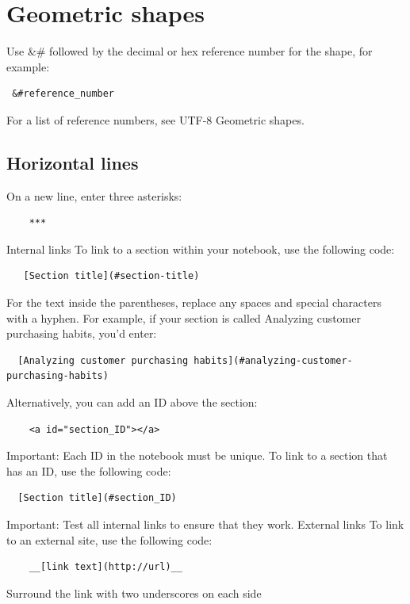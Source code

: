 \section{Geometric shapes}
Use \&\# followed by the decimal or hex reference number for the shape, for example:
\begin{verbatim}
 &#reference_number   
\end{verbatim}

For a list of reference numbers, see UTF-8 Geometric shapes.

\subsection{Horizontal lines}
On a new line, enter three asterisks:
\begin{verbatim}
    ***
\end{verbatim}

Internal links
To link to a section within your notebook, use the following code:
\begin{verbatim}
   [Section title](#section-title) 
\end{verbatim}

For the text inside the parentheses, replace any spaces and special characters with a hyphen. For example, if your section is called Analyzing customer purchasing habits, you'd enter:
\begin{verbatim}
  [Analyzing customer purchasing habits](#analyzing-customer-purchasing-habits)  
\end{verbatim}


Alternatively, you can add an ID above the section:
\begin{verbatim}
    <a id="section_ID"></a>
\end{verbatim}

Important: Each ID in the notebook must be unique.
To link to a section that has an ID, use the following code:
\begin{verbatim}
  [Section title](#section_ID)  
\end{verbatim}


Important: Test all internal links to ensure that they work.
External links
To link to an external site, use the following code:
\begin{verbatim}
    __[link text](http://url)__
\end{verbatim}

Surround the link with two underscores on each side

